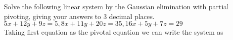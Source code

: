 \documentclass[12pt,class=book,crop=false]{standalone}
\begin{document}
\begin{ex}
    Solve the following linear system by the Gaussian elimination with partial pivoting, giving your answers to 3 decimal places.
    $5x+12y+9z=5, 8x+11y+20z=35, 16x+5y+7z=29$\\

    Taking first equation as the pivotal equation we can write the system as

\end{ex}
\end{document}
